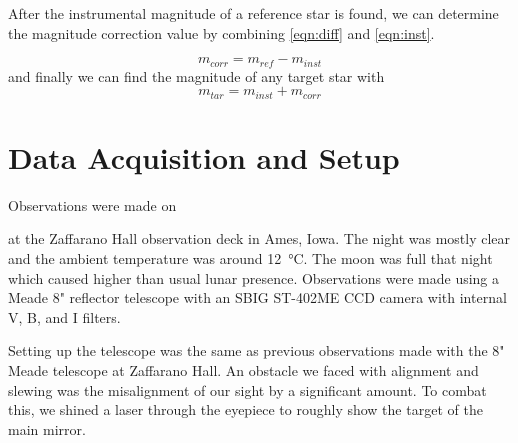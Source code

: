 \documentclass[%
aip,
jmp,
reprint,
floatfix
]{revtex4-1}
\begin{document}
	After the instrumental magnitude of a reference star is found, we can determine the magnitude correction value by combining \autoref{eqn:diff} and \autoref{eqn:inst}.
	
	\begin{equation}
		m_{corr} = m_{ref} - m_{inst}
		\label{eqn:corrected}
	\end{equation}
	and finally we can find the magnitude of any target star with 
	\begin{equation}
		m_{tar} = m_{inst} + m_{corr}
		\label{eqn:final}
	\end{equation}
	



	\section{Data Acquisition and Setup}
	Observations were made on \date{06 September 2017} at the Zaffarano Hall observation deck in Ames, Iowa. The night was mostly clear and the ambient temperature was around \SI{12}{\degreeCelsius}. The moon was full that night which caused higher than usual lunar presence. Observations were made using a Meade 8" reflector telescope with an SBIG ST-402ME CCD camera with internal V, B, and I filters. 
	
	Setting up the telescope was the same as previous observations made with the 8" Meade telescope at Zaffarano Hall. An obstacle we faced with alignment and slewing was the misalignment of our sight by a significant amount. To combat this, we shined a laser through the eyepiece to roughly show the target of the main mirror.
	
\end{document}
